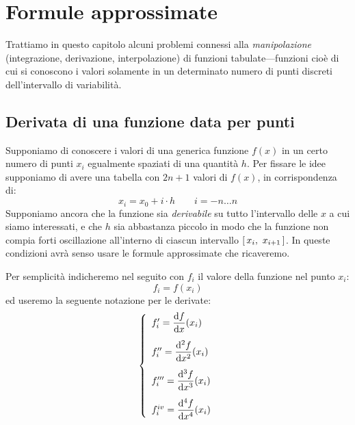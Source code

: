 \chapter{Formule approssimate}
\mt

Trattiamo in questo capitolo alcuni problemi connessi alla
\emph{manipolazione} (integrazione, derivazione, interpolazione) di funzioni
tabulate---funzioni cio\`e di cui si conoscono i valori solamente in
un determinato numero di punti discreti dell'intervallo di variabilit\`a.


\section{Derivata di una funzione data per punti}

Supponiamo di conoscere i valori di una generica funzione $f(x)$ in
un certo numero di punti $x_i$ egualmente spaziati di una quantit\`a $h$.
Per fissare le idee supponiamo di avere una tabella con $2n + 1$ valori di
$f(x)$, in corrispondenza di:
$$
x_i = x_0 + i \cdot h \qquad i = -n \ldots n
$$
Supponiamo ancora che la funzione sia {\itshape derivabile} su tutto
l'intervallo delle $x$ a cui siamo interessati, e che $h$ sia abbastanza
piccolo in modo che la funzione non compia forti oscillazione
all'interno di ciascun intervallo $\left[ \, x_i, ~ x_{i+1} \, \right]$.
In queste condizioni avr\`a senso usare le formule approssimate che
ricaveremo.

Per semplicit\`a indicheremo nel seguito con $f_i$ il valore della funzione
nel punto $x_i$:
$$
f_i = f(x_i)
$$
ed useremo la seguente notazione per le derivate:
$$
\left \{ \begin{array}{l}
f'_i   = \tfdereval{f}{x}{x_i}
\vspace{0.3cm}\\
f''_i  = \tsdereval{f}{x}{x_i}
\vspace{0.3cm}\\
f'''_i = \tndereval{f}{x}{x_i}{3}
\vspace{0.3cm}\\
f^{iv}_i  = \tndereval{f}{x}{x_i}{4} 
\end{array} \right.
$$

